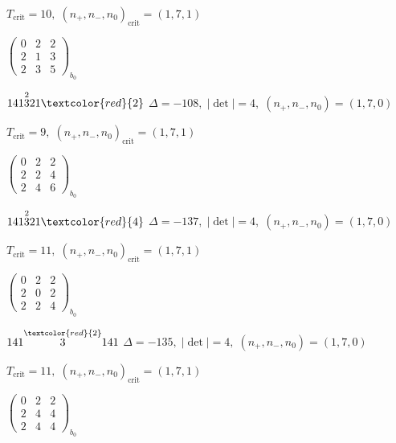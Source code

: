 \documentclass[10pt]{article}
\begin{document}
\hspace{1em}$T_{\text{crit}}=10,\; (n_+,n_-,n_0)_{\text{crit}}=(1,7,1)$

\hspace{2em}$\left(\begin{smallmatrix}0 & 2 & 2 \\ 2 & 1 & 3 \\ 2 & 3 & 5\end{smallmatrix}\right)_{\!b_0}$

\smallskip

$141\overset{2}{3}21\textcolor{red}{2}$ \quad $\Delta=-108,\; |\det|=4,\; (n_+,n_-,n_0)=(1,7,0)$

\hspace{1em}$T_{\text{crit}}=9,\; (n_+,n_-,n_0)_{\text{crit}}=(1,7,1)$

\hspace{2em}$\left(\begin{smallmatrix}0 & 2 & 2 \\ 2 & 2 & 4 \\ 2 & 4 & 6\end{smallmatrix}\right)_{\!b_0}$

$141\overset{2}{3}21\textcolor{red}{4}$ \quad $\Delta=-137,\; |\det|=4,\; (n_+,n_-,n_0)=(1,7,0)$

\hspace{1em}$T_{\text{crit}}=11,\; (n_+,n_-,n_0)_{\text{crit}}=(1,7,1)$

\hspace{2em}$\left(\begin{smallmatrix}0 & 2 & 2 \\ 2 & 0 & 2 \\ 2 & 2 & 4\end{smallmatrix}\right)_{\!b_0}$

\smallskip

$141\overset{\textcolor{red}{2}}{3}141$ \quad $\Delta=-135,\; |\det|=4,\; (n_+,n_-,n_0)=(1,7,0)$

\hspace{1em}$T_{\text{crit}}=11,\; (n_+,n_-,n_0)_{\text{crit}}=(1,7,1)$

\hspace{2em}$\left(\begin{smallmatrix}0 & 2 & 2 \\ 2 & 4 & 4 \\ 2 & 4 & 4\end{smallmatrix}\right)_{\!b_0}$
\end{document}
